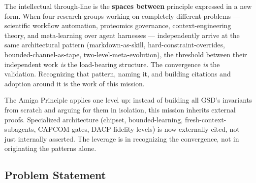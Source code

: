\documentclass[11pt,letterpaper]{article}
\begin{document}
The intellectual through-line is the \textbf{spaces between} principle expressed in a new form. When four research groups working on completely different problems --- scientific workflow automation, proteomics governance, context-engineering theory, and meta-learning over agent harnesses --- independently arrive at the same architectural pattern (markdown-as-skill, hard-constraint-overrides, bounded-channel-as-tape, two-level-meta-evolution), the threshold between their independent work \textit{is} the load-bearing structure. The convergence \textit{is} the validation. Recognizing that pattern, naming it, and building citations and adoption around it is the work of this mission.

The Amiga Principle applies one level up: instead of building all GSD's invariants from scratch and arguing for them in isolation, this mission inherits external proofs. Specialized architecture (chipset, bounded-learning, fresh-context-subagents, CAPCOM gates, DACP fidelity levels) is now externally cited, not just internally asserted. The leverage is in recognizing the convergence, not in originating the patterns alone.

\subsection{Problem Statement}
\end{document}
